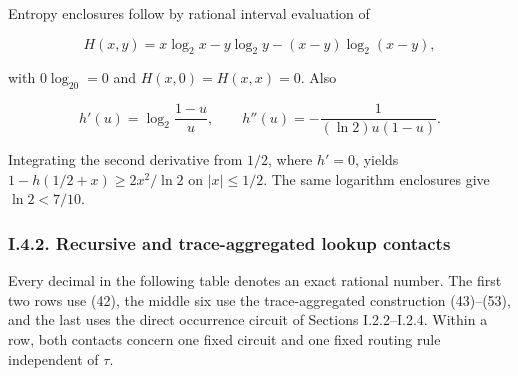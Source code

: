 Entropy enclosures follow by rational interval evaluation of

\[
H(x,y)=x\log_2x-y\log_2y-(x-y)\log_2(x-y),
\]

with \(0\log_20=0\) and \(H(x,0)=H(x,x)=0\). Also

\[
h'(u)=\log_2\frac{1-u}{u},\qquad
h''(u)=-\frac1{(\ln2)u(1-u)}.
\]

Integrating the second derivative from \(1/2\), where \(h'=0\), yields \(1-h(1/2+x)\ge2x^2/\ln2\) on \(|x|\le1/2\). The same logarithm enclosures give \(\ln2<7/10\).

\hypertarget{af-a9ec399514-i.4.2.-recursive-and-trace-aggregated-lookup-contacts}{%
\subsubsection{I.4.2. Recursive and trace-aggregated lookup contacts}\label{af-a9ec399514-i.4.2.-recursive-and-trace-aggregated-lookup-contacts}}

Every decimal in the following table denotes an exact rational number. The first two rows use (42), the middle six use the trace-aggregated construction (43)--(53), and the last uses the direct occurrence circuit of Sections I.2.2--I.2.4. Within a row, both contacts concern one fixed circuit and one fixed routing rule independent of \(\tau\).

